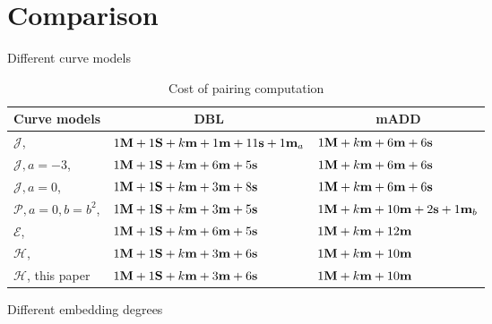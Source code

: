 \section{Comparison}

Different curve models

\begin{table}[h]
\centering
\caption{Cost of pairing computation}

\begin{tabular}{ l | l | l}
\hline
\multicolumn{1}{c|}{Curve models}	&\multicolumn{1}{c|}{DBL}	&\multicolumn{1}{c}{mADD}	\\
\hline
$\mathcal{J}$, \cite{2008/IonicaJoux08} \cite{2009/fastertate}
				&$1\textbf{M} + 1\textbf{S} + k\textbf{m} + 1\textbf{m} + 11\textbf{s} + 1\textbf{m}_{a}$	&$1\textbf{M} + k\textbf{m} + 6\textbf{m} + 6\textbf{s}$	\\
$\mathcal{J},a = -3$, \cite{2009/fastertate}
				&$1\textbf{M} + 1\textbf{S} + k\textbf{m} + 6\textbf{m} + 5\textbf{s}$		&$1\textbf{M} + k\textbf{m} + 6\textbf{m} + 6\textbf{s}$	\\
$\mathcal{J},a = 0$, \cite{2009/fastertate}		
				&$1\textbf{M} + 1\textbf{S} + k\textbf{m} + 3\textbf{m} + 8\textbf{s}$		&$1\textbf{M} + k\textbf{m} + 6\textbf{m} + 6\textbf{s}$	\\
$\mathcal{P},a = 0, b = b^2$, \cite{2009/craig}
				&$1\textbf{M} + 1\textbf{S} + k\textbf{m} + 3\textbf{m} + 5\textbf{s}$		&$1\textbf{M} + k\textbf{m} + 10\textbf{m} + 2\textbf{s} + 1\textbf{m}_{b}$	\\
$\mathcal{E}$, \cite{2009/fastertate}			
				&$1\textbf{M} + 1\textbf{S} + k\textbf{m} + 6\textbf{m} + 5\textbf{s}$		&$1\textbf{M} + k\textbf{m} + 12\textbf{m}$	\\
$\mathcal{H}$, \cite{2010/Gu}			&$1\textbf{M} + 1\textbf{S} + k\textbf{m} + 3\textbf{m} + 6\textbf{s}$		&$1\textbf{M} + k\textbf{m} + 10\textbf{m}$	\\
$\mathcal{H}$, this paper	&$1\textbf{M} + 1\textbf{S} + k\textbf{m} + 3\textbf{m} + 6\textbf{s}$		&$1\textbf{M} + k\textbf{m} + 10\textbf{m}$	\\
\hline
\end{tabular}
\label{tbl-cmp}


\end{table}




Different embedding degrees
